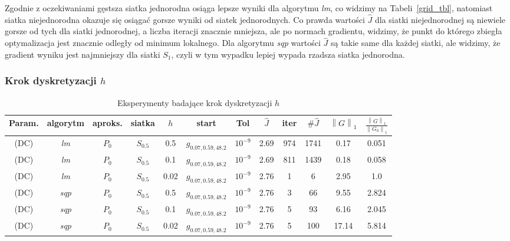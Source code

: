 \documentclass[11pt]{article}
\newcommand{\norm}[1]{\left\lVert#1\right\rVert}
\begin{document}
Zgodnie z oczekiwaniami gęstsza siatka jednorodna osiąga lepsze wyniki dla algorytmu {\it lm}, co widzimy na Tabeli~\ref{grid_tbl}, natomiast siatka niejednorodna okazuje się osiągać gorsze wyniki od siatek jednorodnych. Co prawda wartości $\hat{J}$ dla siatki niejednorodnej są niewiele gorsze od tych dla siatki jednorodnej, a liczba iteracji znacznie mniejsza, ale po normach gradientu, widzimy, że punkt do którego zbiegła optymalizacja jest znacznie odległy od minimum lokalnego. Dla algorytmu {\it sqp\/} wartości $\hat{J}$ są takie same dla każdej siatki, ale widzimy, że gradient wyniku jest najmniejszy dla siatki $S_1$, czyli w tym wypadku lepiej wypada rzadsza siatka jednorodna.

\subsubsection{Krok dyskretyzacji $h$}

\begin{table}[h]
  \begin{center}
    \begin{tabular}{|c|c|c|c|c|c|c||c|c|c|c|c|}
      \hline
      Param. & algorytm & aproks. & siatka & $h$ & start & Tol & $\hat{J}$ & iter & $\#\hat{J}$ & $\norm{G}_1$ & $\frac{\norm{G}_1}{\norm{G_0}_1}$ \\
      \hline
      (DC) & {\it lm\/} & $P_0$ & $S_{0.5}$ & 0.5 & $g_{0.07,0.59,48.2}$ & $10^{-9}$ & 2.69 & 974 & 1741 & 0.17 & 0.051 \\
      \hline
      (DC) & {\it lm\/} & $P_0$ & $S_{0.5}$ & 0.1 & $g_{0.07,0.59,48.2}$ & $10^{-9}$ & 2.69 & 811 & 1439 & 0.18 & 0.058 \\
      \hline
      (DC) & {\it lm\/} & $P_0$ & $S_{0.5}$ & 0.02 & $g_{0.07,0.59,48.2}$ & $10^{-9}$ & 2.76 & 1 & 6 & 2.95 & 1.0 \\
      \hline
      (DC) & {\it sqp\/} & $P_0$ & $S_{0.5}$ & 0.5 & $g_{0.07,0.59,48.2}$ & $10^{-9}$ & 2.76 & 3 & 66 & 9.55 & 2.824 \\
      \hline
      (DC) & {\it sqp\/} & $P_0$ & $S_{0.5}$ & 0.1 & $g_{0.07,0.59,48.2}$ & $10^{-9}$ & 2.76 & 5 & 93 & 6.16 & 2.045 \\
      \hline
      (DC) & {\it sqp\/} & $P_0$ & $S_{0.5}$ & 0.02 & $g_{0.07,0.59,48.2}$ & $10^{-9}$ & 2.76 & 5 & 100 & 17.14 & 5.814 \\
      \hline
    \end{tabular}
    \caption{Eksperymenty badające krok dyskretyzacji $h$}\label{step_tbl}
  \end{center}
\end{table}
\end{document}
